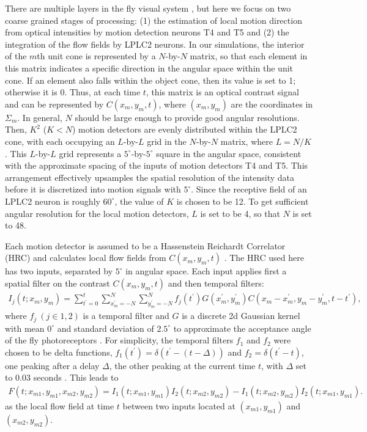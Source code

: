 \documentclass[pdftex,9pt,lineno]{elife}
\begin{document}
There are multiple layers in the fly visual system \citep{takemura2017comprehensive}, but here we focus on two coarse grained stages of processing: (1) the estimation of local motion direction from optical intensities by motion detection neurons T4 and T5 and (2) the integration of the flow fields by LPLC2 neurons. In our simulations, the interior of the $m$th unit cone is represented by a $N$-by-$N$ matrix, so that each element in this matrix indicates a specific direction in the angular space within the unit cone. If an element also falls within the object cone, then its value is set to 1; otherwise it is 0. Thus, at each time $t$, this matrix is an optical contrast signal and can be represented by $C(x_{m},y_{m},t)$, where $(x_{m},y_{m})$ are the coordinates in $\Sigma_{m}$. In general, $N$ should be large enough to provide good angular resolutions. Then, $K^{2}$ ($K<N$) motion detectors are evenly distributed within the LPLC2 cone, with each occupying an $L$-by-$L$ grid in the $N$-by-$N$ matrix, where $L=N/K$. This $L$-by-$L$ grid represents a $5^{\circ}$-by-$5^{\circ}$ square in the angular space, consistent with the approximate spacing of the inputs of motion detectors T4 and T5. This arrangement effectively upsamples the spatial resolution of the intensity data before it is discretized into motion signals with $5^{\circ}$. Since the receptive field of an LPLC2 neuron is roughly $60^{\circ}$, the value of $K$ is chosen to be 12. To get sufficient angular resolution for the local motion detectors, $L$ is set to be 4, so that $N$ is set to 48.

Each motion detector is assumed to be a Hassenstein Reichardt Correlator (HRC) and calculates local flow fields from $C(x_{m},y_{m},t)$ \citep{hassenstein1956systemtheoretische}. The HRC used here has two inputs, separated by $5^{\circ}$ in angular space. Each input applies first a spatial filter on the contrast $C(x_{m},y_{m},t)$ and then temporal filters:
\begin{align}
I_{j}(t;x_{m},y_{m}) = \sum_{t^{'}=0}^{t}\sum_{x^{'}_{m}=-N}^{N}\sum_{y^{'}_{m}=-N}^{N}f_{j}(t^{'})G(x^{'}_{m},y^{'}_{m})C(x_{m}-x^{'}_{m},y_{m}-y^{'}_{m},t-t^{'}),
\end{align}
where $f_{j}\ (j \in {1,2})$ is a temporal filter and $G$ is a discrete 2d Gaussian kernel with mean $0^{\circ}$ and standard deviation of $2.5^{\circ}$ to approximate the acceptance angle of the fly photoreceptors \citep{stavenga2003angular}. For simplicity, the temporal filters $f_{1}$ and $f_{2}$ were chosen to be delta functions, $f_{1}(t^{'})=\delta (t^{'}-(t-\Delta))$ and $f_{2}=\delta (t^{'}-t)$, one peaking after a delay $\Delta$, the other peaking at the current time $t$, with $\Delta$ set to 0.03 seconds \citep{salazar2016direct}. This leads to
\begin{align}\label{eq:HRC}
F(t;x_{m1},y_{m1},x_{m2},y_{m2}) = I_{1}(t;x_{m1},y_{m1})I_{2}(t;x_{m2},y_{m2})-I_{1}(t;x_{m2},y_{m2})I_{2}(t;x_{m1},y_{m1}).
\end{align}
as the local flow field at time $t$ between two inputs located at $(x_{m1},y_{m1})$ and $(x_{m2},y_{m2})$.
\end{document}
